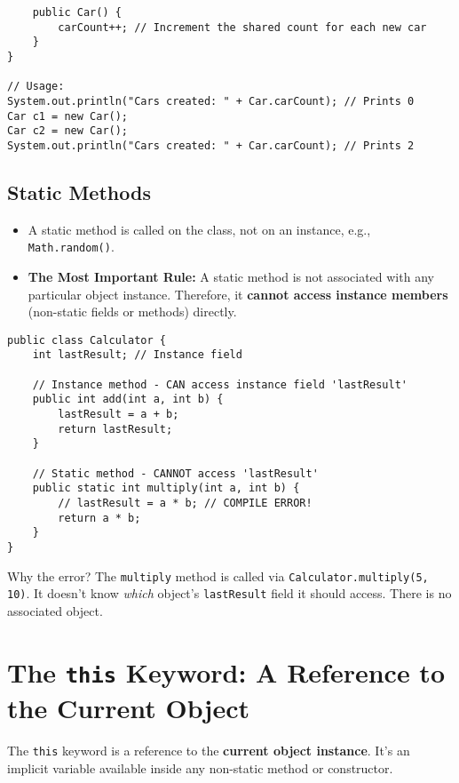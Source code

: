 \documentclass[12pt]{article}
\begin{document}
\begin{enumerate}[label=(\arabic*)]
\begin{verbatim}
    public Car() {
        carCount++; // Increment the shared count for each new car
    }
}

// Usage:
System.out.println("Cars created: " + Car.carCount); // Prints 0
Car c1 = new Car();
Car c2 = new Car();
System.out.println("Cars created: " + Car.carCount); // Prints 2
\end{verbatim}

\subsection*{Static Methods}
\begin{itemize}
    \item A static method is called on the class, not on an instance, e.g., \texttt{Math.random()}.
    \item \textbf{The Most Important Rule:} A static method is not associated with any particular object instance. Therefore, it \textbf{cannot access instance members} (non-static fields or methods) directly.
\end{itemize}

\begin{verbatim}
public class Calculator {
    int lastResult; // Instance field

    // Instance method - CAN access instance field 'lastResult'
    public int add(int a, int b) {
        lastResult = a + b;
        return lastResult;
    }

    // Static method - CANNOT access 'lastResult'
    public static int multiply(int a, int b) {
        // lastResult = a * b; // COMPILE ERROR! 
        return a * b;
    }
}
\end{verbatim}
Why the error? The \texttt{multiply} method is called via \texttt{Calculator.multiply(5, 10)}. It doesn't know \textit{which} object's \texttt{lastResult} field it should access. There is no associated object.

\section{The \texttt{this} Keyword: A Reference to the Current Object}
The \texttt{this} keyword is a reference to the \textbf{current object instance}. It's an implicit variable available inside any non-static method or constructor.


\end{enumerate}
\end{document}
